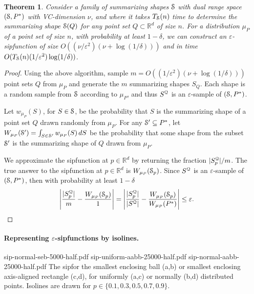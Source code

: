 \documentclass{journal}
\newcommand{\eps}{\varepsilon}
\newcommand{\Eu}[1]{\ensuremath{\EuScript{#1}}}
\newcommand{\R}{\ensuremath{\mathbb{R}}}
\newcommand{\sip}{\textsf{sip\xspace}}
\newtheorem {theorem}{Theorem}[section]
\begin{document}
\begin{theorem}
Consider a family of summarizing shapes $\Eu{S}$ with dual range space $(\Eu{S}, P^*)$ with VC-dimension $\nu$, and where it takes $T_{\Eu{S}}(n)$ time to determine the summarizing shape $\Eu{S}(Q)$ for any point set $Q \subset \R^d$ of size $n$.
For a distribution $\mu_P$ of a point set of size $n$, with probability at least $1-\delta$,
we can construct an $\eps$-\sip function of size $O((\nu/\eps^2) (\nu +  \log (1/\delta)))$
and in time $O(T_{\Eu{S}}(n)(1/\eps^2) \log (1/\delta))$.
\label{thm:rand-sip}
\end{theorem}
\begin{proof}
Using the above algorithm, sample $m = O((1/\eps^2) (\nu + \log (1/\delta)))$ point sets $Q$ from $\mu_P$ and generate the $m$ summarizing shapes $S_Q$.
Each shape is a random sample from $\Eu{S}$ according to $\mu_P$, and thus $S^{\Eu{Q}}$ is an $\eps$-sample of $(\Eu{S}, P^*)$.

Let $w_{\mu_P}(S)$, for $S \in \Eu{S}$, be the probability that $S$ is the summarizing shape of a point set $Q$ drawn randomly from $\mu_P$.
For any $\Eu{S}^\prime \subseteq P^*$, let $W_{\mu_P}(\Eu{S}^\prime) = \int_{S \in \Eu{S}^\prime} w_{\mu_P}(S) \, dS$ be the probability that some shape from the subset $\Eu{S}^\prime$ is the summarizing shape of $Q$ drawn from $\mu_P$.

We approximate the \sip function at $p \in \R^d$ by returning the fraction $|S^{\Eu{Q}}_p| / m$.
The true answer to the \sip function at $p \in \R^d$ is $W_{\mu_P}(\Eu{S}_p)$.
Since $S^{\Eu{Q}}$ is an $\eps$-sample of $(\Eu{S}, P^*)$, then with probability at least $1-\delta$
\[
\left| \frac{|S^{\Eu{Q}}_p|}{m} - \frac{W_{\mu_P}(\Eu{S}_p)}{1} \right|
=
\left| \frac{|S^{\Eu{Q}}_p|}{|S^{\Eu{Q}}|} - \frac{W_{\mu_P}(\Eu{S}_p)}{W_{\mu_P}(P^*)} \right|
\leq \eps.  \qedhere
\]
\end{proof}



\paragraph{Representing $\eps$-\sip functions by isolines.}

 {sip-normal-seb-5000-half.pdf} 
{sip-uniform-aabb-25000-half.pdf} {sip-normal-aabb-25000-half.pdf}
{ \label {fig:sip-seb} 
  The \sip for the smallest enclosing ball (a,b) or smallest enclosing 
  axis-aligned rectangle (c,d), for uniformly (a,c) or normally (b,d) 
  distributed points. Isolines are drawn for $p\in \{0.1,0.3,0.5,0.7,0.9\}$.
}
\end{document}
